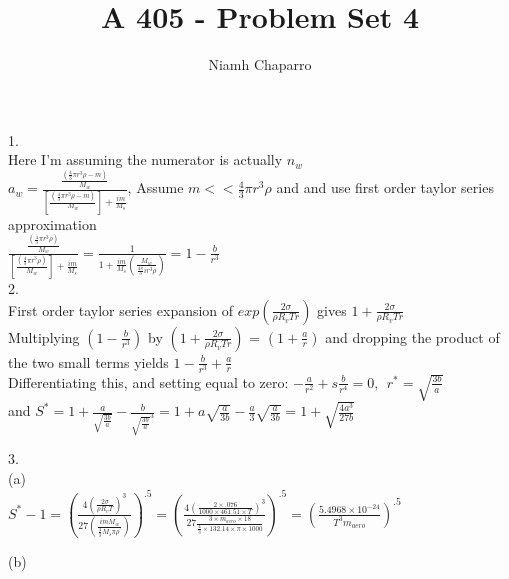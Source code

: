 \documentclass[11pt]{article} %
\title{A 405 - Problem Set 4}
\author{Niamh Chaparro}
\begin{document}
\maketitle

1.\\

Here I'm assuming the numerator is actually $n_{w}$ \\

$a_{w} = \frac{\frac{(\frac{4}{3} \pi r^{3} \rho - m)}{M_{w}}}{[\frac{(\frac{4}{3} \pi r^{3} \rho - m)}{M_{w}}] + \frac{i m}{M_{s}}}$,  Assume $m << \frac{4}{3} \pi r^{3} \rho$ and and use first order taylor series approximation\\

 $\frac{\frac{(\frac{4}{3} \pi r^{3} \rho)}{M_{w}}}{[\frac{(\frac{4}{3} \pi r^{3} \rho)}{M_{w}}] + \frac{i m}{M_{s}}} = \frac{1}{1 + \frac{im}{M_{s}}(\frac{M_{w}}{\frac{4 \pi}{3}i r^{3}\rho})} = 1 - \frac{b}{r^{3}}$\\

2.\\


First order taylor series expansion of $exp(\frac{2 \sigma}{\rho R_{v} T r})$
gives $1 + \frac{2 \sigma}{\rho R_{v} T r}$\\

Multiplying $(1 - \frac{b}{r^{3}})$ by $(1 + \frac{2 \sigma}{\rho R_{v} T r})$ = $(1 + \frac{a}{r})$
and dropping the product of the two small terms yields $1 - \frac{b}{r^{3}} + \frac{a}{r}$\\

Differentiating this, and setting equal to zero: $-\frac{a}{r^{2}} + s\frac{b}{r^{4}} = 0,\ \ r^{*} = \sqrt{\frac{3b}{a}}$\\

and $S^{*} = 1 + \frac{a}{\sqrt{\frac{3b}{a}}}  - \frac{b}{\sqrt{\frac{3b}{a}}^{3}} = 1 + a \sqrt{\frac{a}{3b}} - \frac{a}{3}\sqrt{\frac{a}{3b}} = 1 + \sqrt{\frac{4a^{3}}{27b}}$

3.\\

(a)\\

$S^{*} - 1 = (\frac{4(\frac{2\sigma}{\rho R_{v} T})^{3}}{27(\frac{imM_{w}}{\frac{4}{3}M_{s}\pi\rho^{'}})})^{.5} = (\frac{4(\frac{2 \times .076}{1000 \times 461.51 \times T})^{3}}{27\frac{3 \times m_{aero} \times 18}{\frac{4}{3}\times 132.14 \times \pi \times 1000}})^{.5} = (\frac{5.4968 \times 10^{-24}}{T^{3}m_{aero}})^{.5}$


(b)\\
\end{document}
